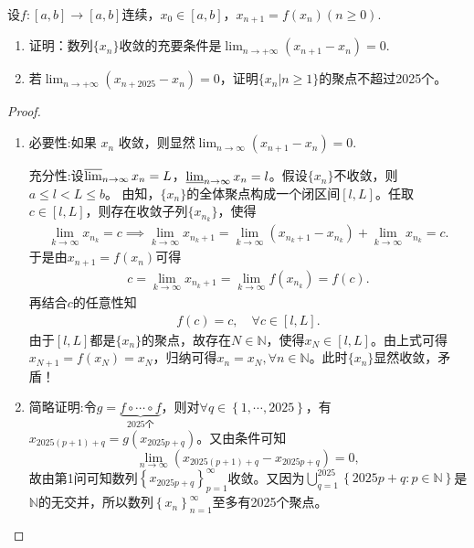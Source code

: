 \documentclass[../../main.tex]{subfiles}%
\begin{document}
\begin{example}
设\( f: [a,b] \to [a,b] \)连续，\( x_0 \in [a,b] \)，\( x_{n+1} = f(x_n) (n \geqslant 0) \).
\begin{enumerate}
\item 证明：数列\( \{x_n\} \)收敛的充要条件是\( \lim_{n \to +\infty} (x_{n+1} - x_n) = 0 \).

\item 若\( \lim_{n \to +\infty} (x_{n+2025} - x_n) = 0 \)，证明\( \{x_n | n \geqslant 1\} \)的聚点不超过2025个。
\end{enumerate}
\end{example}
\begin{proof}
\begin{enumerate}
\item {\heiti 必要性:}如果 \( x_{n} \) 收敛，则显然$\lim _{n \to \infty } ( x_{n+1}-x_{n})=0$.

{\heiti 充分性:}设\( \varlimsup_{n \to \infty} x_n = L \)，\( \varliminf_{n \to \infty} x_n = l \)。假设\( \{x_n\} \)不收敛，则\( a \leqslant l < L \leqslant b \)。
由知，\( \{x_n\} \)的全体聚点构成一个闭区间\( [l, L] \)。任取\( c \in [l, L] \)，则存在收敛子列\( \{x_{n_k}\} \)，使得
\begin{align*}
\lim_{k \to \infty} x_{n_k} = c \implies \lim_{k \to \infty} x_{n_k + 1} = \lim_{k \to \infty} (x_{n_k + 1} - x_{n_k}) + \lim_{k \to \infty} x_{n_k} = c.
\end{align*}
于是由\( x_{n+1} = f(x_n) \)可得
\begin{align*}
c = \lim_{k \to \infty} x_{n_k + 1} = \lim_{k \to \infty} f(x_{n_k}) = f(c).
\end{align*}
再结合\( c \)的任意性知
\begin{align*}
f(c) = c, \quad \forall c \in [l, L].
\end{align*}
由于\( [l, L] \)都是\( \{x_n\} \)的聚点，故存在\( N \in \mathbb{N} \)，使得\( x_N \in [l, L] \)。由上式可得\( x_{N+1} = f(x_N) = x_N \)，归纳可得\( x_n = x_N, \forall n \in \mathbb{N} \)。此时\( \{x_n\} \)显然收敛，矛盾！


\item {\color{blue}简略证明:}令$g=\underset{2025\text{个}}{\underbrace{f\circ \cdots \circ f}}$，则对$\forall q\in \left\{ 1,\cdots ,2025 \right\}$，有$x_{2025\left( p+1 \right) +q}=g\left( x_{2025p+q} \right)$。又由条件可知
$$
\lim\limits_{n\rightarrow \infty}\left( x_{2025\left( p+1 \right) +q}-x_{2025p+q} \right) =0,
$$
故由第1问可知数列$\left\{ x_{2025p+q} \right\} _{p=1}^{\infty}$收敛。又因为$\bigcup_{q=1}^{2025}{\left\{ 2025p+q:p\in \mathbb{N} \right\}}$是$\mathbb{N}$的无交并，所以数列$\left\{ x_n \right\} _{n=1}^{\infty}$至多有2025个聚点。


\end{enumerate}
\end{proof}
\end{document}
